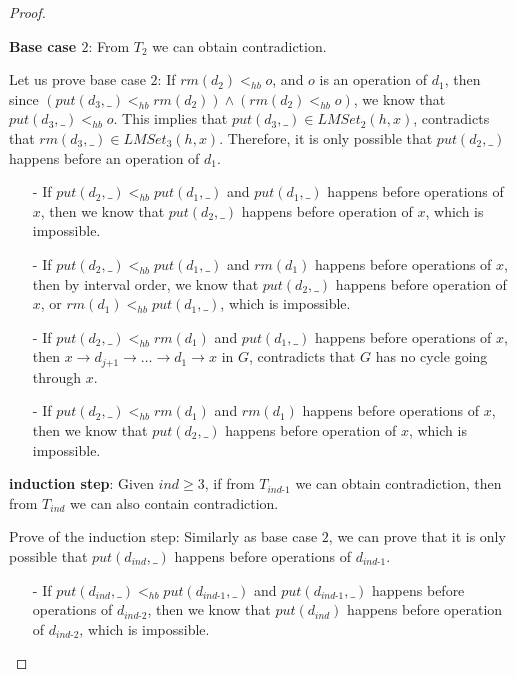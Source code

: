 \begin {proof}
\begin{itemize}
    {\bf Base case $2$}: From $T_2$ we can obtain contradiction.

    Let us prove base case $2$: If $\textit{rm}(d_2) <_{hb} o$, and $o$ is an operation of $d_1$, then since $( \textit{put}(d_3,\_) <_{hb} \textit{rm}(d_2) ) \wedge ( \textit{rm}(d_2) <_{hb} o )$, we know that $\textit{put}(d_3,\_) <_{hb} o$. This implies that $\textit{put}(d_3,\_) \in \textit{LMSet}_2(h,x)$, contradicts that $\textit{rm}(d_3,\_) \in \textit{LMSet}_3(h,x)$. Therefore, it is only possible that $\textit{put}(d_2,\_)$ happens before an operation of $d_1$.

    \begin{itemize}
    \setlength{\itemsep}{0.5pt}
    \item[-] If $\textit{put}(d_2,\_) <_{hb} \textit{put}(d_1,\_)$ and $\textit{put}(d_1,\_)$ happens before operations of $x$, then we know that $\textit{put}(d_2,\_)$ happens before operation of $x$, which is impossible.

    \item[-] If $\textit{put}(d_2,\_) <_{hb} \textit{put}(d_1,\_)$ and $\textit{rm}(d_1)$ happens before operations of $x$, then by interval order, we know that $\textit{put}(d_2,\_)$ happens before operation of $x$, or $\textit{rm}(d_1) <_{hb} \textit{put}(d_1,\_)$, which is impossible.

    \item[-] If $\textit{put}(d_2,\_) <_{hb} \textit{rm}(d_1)$ and $\textit{put}(d_1,\_)$ happens before operations of $x$, then $x \rightarrow d_{\textit{j+1}} \rightarrow \ldots \rightarrow d_1 \rightarrow x$ in $G$, contradicts that $G$ has no cycle going through $x$.

    \item[-] If $\textit{put}(d_2,\_) <_{hb} \textit{rm}(d_1)$ and $\textit{rm}(d_1)$ happens before operations of $x$, then we know that $\textit{put}(d_2,\_)$ happens before operation of $x$, which is impossible.
    \end{itemize}

    {\bf induction step}: Given $\textit{ind} \geq 3$, if from $T_{\textit{ind-1}}$ we can obtain contradiction, then from $T_{\textit{ind}}$ we can also contain contradiction.


    Prove of the induction step: Similarly as base case $2$, we can prove that it is only possible that $\textit{put}(d_{\textit{ind}},\_)$ happens before operations of $d_{\textit{ind-1}}$.

    \begin{itemize}
    \setlength{\itemsep}{0.5pt}
    \item[-] If $\textit{put}(d_{\textit{ind}},\_) <_{hb} \textit{put}(d_{\textit{ind-1}},\_)$ and $\textit{put}(d_{\textit{ind-1}},\_)$ happens before operations of $d_{\textit{ind-2}}$, then we know that $\textit{put}(d_{\textit{ind}})$ happens before operation of $d_{\textit{ind-2}}$, which is impossible.


\end{itemize}
\end{itemize}
\end{proof}
